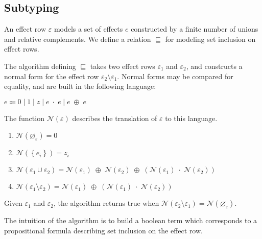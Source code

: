 \documentclass[12pt]{article}
\newcommand\parens[1]{\left( #1 \right)}
\newcommand\row{\varepsilon}
\newcommand\rEmpty{\varnothing_{\row}}
\newcommand\rSingleton[1]{\left\{ #1 \right\}}
\newcommand\rUnion[2]{#1 \cup #2}
\newcommand\rDiff[2]{#1 \setminus #2}
\newcommand\brEmbed[1]{\mathcal{N}\parens{#1}}
\newcommand\brTerm{e}
\newcommand\brVar{z}
\newcommand\brZero{0}
\newcommand\brOne{1}
\newcommand\brAdd[2]{#1 \; \oplus \; #2}
\newcommand\brMul[2]{#1 \; \cdot \; #2}
\newcommand\effect{e}
\newcommand\subrowSym{\sqsubseteq}
\begin{document}
    \subsection{Subtyping}

      An effect row $\row$ models a set of effects $\effect$ constructed by a finite number of unions and relative complements. We define a relation $\subrowSym$ for modeling set inclusion on effect rows.

      The algorithm defining $\subrowSym$ takes two effect rows $\row_1$ and $\row_2$, and constructs a normal form for the effect row $\rDiff{\row_2}{\row_1}$. Normal forms may be compared for equality, and are built in the following language:

      \begin{center}
        $\brTerm \Coloneqq \brZero \mathrel{|} \brOne \mathrel{|} \brVar \mathrel{|} \brMul{\brTerm}{\brTerm} \mathrel{|} \brAdd{\brTerm}{\brTerm}$
      \end{center}

      The function $\brEmbed{\row}$ describes the translation of $\row$ to this language.

      \begin{enumerate}
        \item $\brEmbed{\rEmpty} = 0$
        \item $\brEmbed{\rSingleton{\effect_i}} = \brVar_i$
        \item $\brEmbed{\rUnion{\row_1}{\row_2}} = \brAdd{\brAdd{\brEmbed{\row_1}}{\brEmbed{\row_2}}}{\parens{\brMul{\brEmbed{\row_1}}{\brEmbed{\row_2}}}}$
        \item $\brEmbed{\rDiff{\row_1}{\row_2}} = \brAdd{\brEmbed{\row_1}}{\parens{\brMul{\brEmbed{\row_1}}{\brEmbed{\row_2}}}}$
      \end{enumerate}

      Given $\row_1$ and $\row_2$, the algorithm returns true when $\brEmbed{\rDiff{\row_2}{\row_1}} = \brEmbed{\rEmpty}$.

      The intuition of the algorithm is to build a boolean term which corresponds to a propositional formula describing set inclusion on the effect row.
\end{document}
